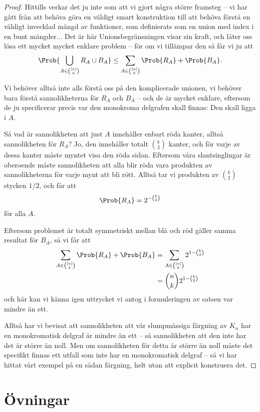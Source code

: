 \documentclass[nobib]{tufte-handout}
\begin{document}
\begin{proposition}
\begin{proof}
        Hittills verkar det ju inte som att vi gjort några större framsteg -- vi har gått från att behöva göra en väldigt smart konstruktion till att behöva förstå en väldigt invecklad mängd av funktioner, som definierats som en union med index i en bunt mängder... Det är här Unionsbegränsningen visar sin kraft, och låter oss lösa ett mycket mycket enklare problem -- för om vi tillämpar den så får vi ju att
        $$\Prob{\bigcup_{A \in \binom{[n]}{k}} R_A \cup B_A} \leq \sum_{A\in \binom{[n]}{k}} \Prob{R_A} + \Prob{B_A}.$$

        Vi behöver alltså inte alls förstå oss på den komplicerade unionen, vi behöver bara förstå sannolikheterna för $R_A$ och $B_A$ -- och de är mycket enklare, eftersom de ju specificerar precis var den monokroma delgrafen skall finnas: Den skall ligga i $A$.

        Så vad är sannolikheten att just $A$ innehåller enbart röda kanter, alltså sannolikheten för $R_A$? Jo, den innehåller totalt $\binom{k}{2}$ kanter, och för varje av dessa kanter måste myntet visa den röda sidan. Eftersom våra slantsinglingar är oberoende måste sannolikheten att alla blir röda vara produkten av sannolikheterna för varje mynt att bli rött. Alltså tar vi produkten av $\binom{k}{2}$ stycken $1/2$, och får att
        $$\Prob{R_A} = 2^{-\binom{k}{2}}$$
        för alla $A$. 
        
        Eftersom problemet är totalt symmetriskt mellan blå och röd gäller samma resultat för $B_A$, så vi får att
        \begin{align*}
            \sum_{A\in \binom{[n]}{k}} \Prob{R_A} + \Prob{B_A} &= \sum_{A\in \binom{[n]}{k}} 2^{1-\binom{k}{2}}\\
            &= \binom{n}{k}2^{1-\binom{k}{2}}
        \end{align*}
        och här kan vi känna igen uttrycket vi antog i formuleringen av satsen var mindre än ett.

        Alltså har vi bevisat att sannolikheten att vår slumpmässiga färgning av $K_n$ har en monokromatisk delgraf är mindre än ett -- så sannolikheten att den inte har det är större än noll. Men om sannolikheten för detta är större än noll måste det specifikt finnas ett utfall som inte har en monokromatisk delgraf -- så vi har hittat vårt exempel på en sådan färgning, helt utan att explicit konstruera det.
    \end{proof}
\end{proposition}

\section{Övningar}
\end{document}
